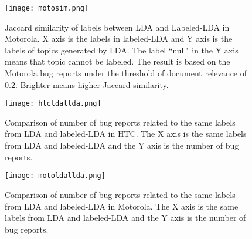 \documentclass[10pt, conference, compsocconf]{IEEEtran}
\begin{document}
\begin{figure*}[htb]
\centering
\texttt{[image: motosim.png]}
\caption{Jaccard similarity of labels between LDA and Labeled-LDA in Motorola. X axis is the labels in labeled-LDA and Y axis is the labels of topics generated by LDA. The label ``null" in the Y axis means that topic cannot be labeled. The result is based on the Motorola bug reports under the threshold of document relevance of 0.2. Brighter means higher Jaccard similarity.}
\label{similaritymoto}
\end{figure*}

\begin{figure}[htb]
\centering
\texttt{[image: htcldallda.png]}
\caption{Comparison of number of bug reports related to the same labels from LDA and labeled-LDA in HTC. The X axis is the same labels from LDA and labeled-LDA and the Y axis is the number of bug reports.}
\label{bughtc}
\end{figure}

\begin{figure}[!htb]
\centering
\texttt{[image: motoldallda.png]}
\caption{Comparison of number of bug reports related to the same labels from LDA and labeled-LDA in Motorola. The X axis is the same labels from LDA and labeled-LDA and the Y axis is the number of bug reports.}
\label{bugmoto}
\end{figure}


\end{document}
